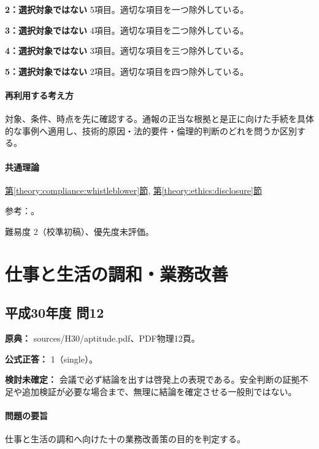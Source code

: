\noindent\textbf{2：選択対象ではない} 5項目。適切な項目を一つ除外している。\par

\noindent\textbf{3：選択対象ではない} 4項目。適切な項目を二つ除外している。\par

\noindent\textbf{4：選択対象ではない} 3項目。適切な項目を三つ除外している。\par

\noindent\textbf{5：選択対象ではない} 2項目。適切な項目を四つ除外している。\par

\paragraph{再利用する考え方} 対象、条件、時点を先に確認する。通報の正当な根拠と是正に向けた手続を具体的な事例へ適用し、技術的原因・法的要件・倫理的判断のどれを問うか区別する。

\paragraph{共通理論} \hyperref[theory:compliance:whistleblower]{第\ref*{theory:compliance:whistleblower}節}, \hyperref[theory:ethics:disclosure]{第\ref*{theory:ethics:disclosure}節}

\par 参考：\cite{ipej_ethics2011,caa_handbook_pre2022,caa_current_faq}。

\par 難易度 2（校準初稿）、優先度未評価。

\section{仕事と生活の調和・業務改善}

\subsection{平成30年度 問12}
\label{q:h30-reg-apt-12}

\noindent\textbf{原典：} sources/H30/aptitude.pdf、PDF物理12頁。

\textbf{公式正答：} 1（single）。

\par\textbf{検討未確定：} 会議で必ず結論を出すは啓発上の表現である。安全判断の証拠不足や追加検証が必要な場合まで、無理に結論を確定させる一般則ではない。

\paragraph{問題の要旨} 仕事と生活の調和へ向けた十の業務改善策の目的を判定する。

